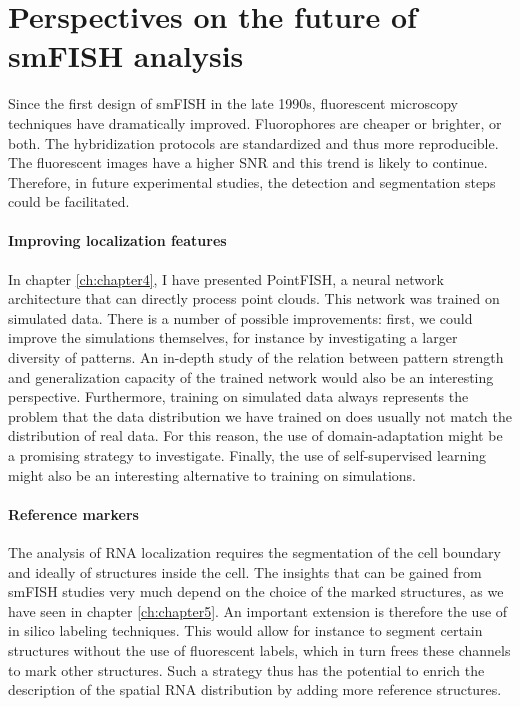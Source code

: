 \section{Perspectives on the future of smFISH analysis}
\label{sec:conclusion_future}

Since the first design of \ac{smFISH} in the late 1990s, fluorescent microscopy techniques have dramatically improved.
Fluorophores are cheaper or brighter, or both.
The hybridization protocols are standardized and thus more reproducible.
The fluorescent images have a higher \ac{SNR} and this trend is likely to continue.
Therefore, in future experimental studies, the detection and segmentation steps could be facilitated.

\paragraph{Improving localization features}
In chapter \ref{ch:chapter4}, I have presented PointFISH, a neural network architecture that can directly process point clouds. This network was trained on simulated data. There is a number of possible improvements: first, we could improve the simulations themselves, for instance by investigating a larger diversity of patterns. An in-depth study of the relation between pattern strength and generalization capacity of the trained network would also be an interesting perspective. Furthermore, training on simulated data always represents the problem that the data distribution we have trained on does usually not match the distribution of real data. For this reason, the use of domain-adaptation might be a promising strategy to investigate. Finally, the use of self-supervised learning might also be an interesting alternative to training on simulations. 

\paragraph{Reference markers}
The analysis of \ac{RNA} localization requires the segmentation of the cell boundary and ideally of structures inside the cell. The insights that can be gained from smFISH studies very much depend on the choice of the marked structures, as we have seen in chapter \ref{ch:chapter5}. An important extension is therefore the use of in silico labeling techniques. This would allow for instance to segment certain structures without the use of fluorescent labels, which in turn frees these channels to mark other structures. Such a strategy thus has the potential to enrich the description of the spatial RNA distribution by adding more reference structures. 

